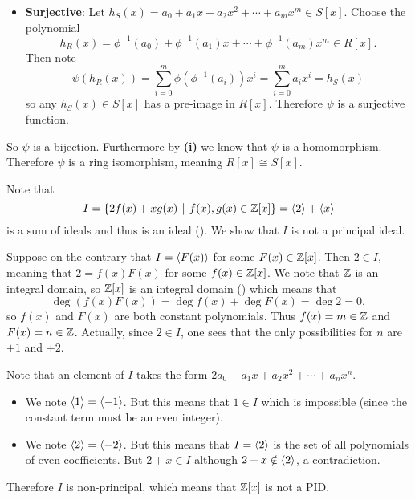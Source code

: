 \begin{questions}
\begin{partquestions}{\roman*}
\begin{itemize}
            \item \textbf{Surjective}: Let $h_S(x) = a_0 + a_1x + a_2x^2 + \cdots + a_mx^m \in S[x]$. Choose the polynomial
            \[
                h_R(x) = \phi^{-1}(a_0) + \phi^{-1}(a_1)x + \cdots + \phi^{-1}(a_m)x^m \in R[x].
            \]
            Then note
            \[
                \psi(h_R(x)) = \sum_{i=0}^m\phi(\phi^{-1}(a_i))x^i = \sum_{i=0}^ma_ix^i = h_S(x)
            \]
            so any $h_S(x) \in S[x]$ has a pre-image in $R[x]$. Therefore $\psi$ is a surjective function.
        \end{itemize}

        So $\psi$ is a bijection. Furthermore by \textbf{(i)} we know that $\psi$ is a homomorphism. Therefore $\psi$ is a ring isomorphism, meaning $R[x] \cong S[x]$.
    \end{partquestions}

    \item Note that
    \[
        I = \{2f(x) + xg(x) \vert f(x),g(x) \in \Z[x]\} = \princ{2} + \princ{x}
    \]
    is a sum of ideals and thus is an ideal (). We show that $I$ is not a principal ideal.

    Suppose on the contrary that $I = \left\langle F(x)\right\rangle$ for some $F(x) \in \mathbb{Z}[x]$. Then $2 \in I$, meaning that $2 = f(x)F(x)$ for some $f(x) \in \mathbb{Z}[x]$. We note that $\mathbb{Z}$ is an integral domain, so $\mathbb{Z}[x]$ is an integral domain () which means that
    \[
        \deg(f(x)F(x)) = \deg f(x) + \deg F(x) = \deg 2 = 0,
    \]
    so $f(x)$ and $F(x)$ are both constant polynomials. Thus $f(x) = m \in \mathbb{Z}$ and $F(x) = n \in \mathbb{Z}$. Actually, since $2 \in I$, one sees that the only possibilities for $n$ are $\pm1$ and $\pm2$.

    Note that an element of $I$ takes the form $2a_0 + a_1x + a_2x^2 + \cdots + a_nx^n$.
    \begin{itemize}
        \item We note $\left\langle1\right\rangle = \left\langle-1\right\rangle$. But this means that $1 \in I$ which is impossible (since the constant term must be an even integer).
        \item We note $\left\langle2\right\rangle = \left\langle-2\right\rangle$. But this means that $I = \left\langle2\right\rangle$ is the set of all polynomials of even coefficients. But $2 + x \in I$ although $2 + x \notin \left\langle2\right\rangle$, a contradiction.
    \end{itemize}

    Therefore $I$ is non-principal, which means that $\mathbb{Z}[x]$ is not a PID.
\end{questions}
